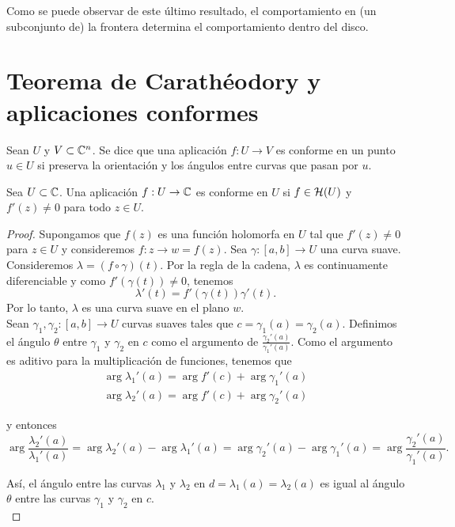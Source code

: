 Como se puede observar de este último resultado, el comportamiento en (un subconjunto de) la frontera determina el comportamiento dentro del disco. \\

\section{Teorema de Carathéodory y aplicaciones conformes}

\begin{definition}%
    Sean $U$ y $V \subset \mathbb{C}^n$. Se dice que una aplicación $f: U \to V$ es conforme en un punto $u \in U$ si preserva la orientación y los ángulos entre curvas que pasan por $u$. \\
\end{definition}

\begin{prop}
    Sea $U \subset \mathbb{C}$. Una aplicación $f: U \to \mathbb{C}$ es conforme en $U$ si $f \in \mathcal{H}(U)$ y $f'(z) \not = 0$ para todo $z \in U$.
\end{prop}

\begin{proof}
    Supongamos que $f(z)$ es una función holomorfa en $U$ tal que $f'(z) \not = 0$ para $z \in U$ y consideremos $f:z \to w=f(z)$. Sea $\gamma: [a,b] \to U$ una curva suave. Consideremos $\lambda = (f \circ  \gamma)(t)$. Por la regla de la cadena, $\lambda$ es continuamente diferenciable y como $f'(\gamma(t)) \not = 0$, tenemos
    \begin{equation}
        \label{eq:cadena}
        \lambda'(t) = f'(\gamma(t))\gamma'(t).
    \end{equation}
    Por lo tanto, $\lambda$ es una curva suave en el plano $w$. \\

    Sean $\gamma_1, \gamma_2: [a,b] \to U$ curvas suaves tales que $c=\gamma_1(a) = \gamma_2(a)$. Definimos el ángulo $\theta$ entre $\gamma_1$ y $\gamma_2$ en $c$ como el argumento de $\frac{\gamma_2'(a)}{\gamma_1'(a)}$. Como el argumento es aditivo para la multiplicación de funciones, tenemos que
    \begin{equation*}
    \begin{split}
        \arg \lambda_1'(a) = \arg f'(c) + \arg \gamma_1'(a)\\
        \arg \lambda_2'(a) = \arg f'(c) + \arg \gamma_2'(a)
    \end{split}
    \end{equation*}

    y entonces
    \begin{equation*}
        \arg  \frac{\lambda_2'(a)}{\lambda_1'(a)} = \arg \lambda_2'(a) - \arg \lambda_1'(a) = \arg \gamma_2'(a) - \arg \gamma_1'(a) = \arg  \frac{\gamma_2'(a)}{\gamma_1'(a)}.
    \end{equation*}

    Así, el ángulo entre las curvas $\lambda_1$ y $\lambda_2$ en $d = \lambda_1(a) = \lambda_2(a)$ es igual al ángulo $\theta$ entre las curvas $\gamma_1$ y $\gamma_2$ en $c$. \\
\end{proof}

